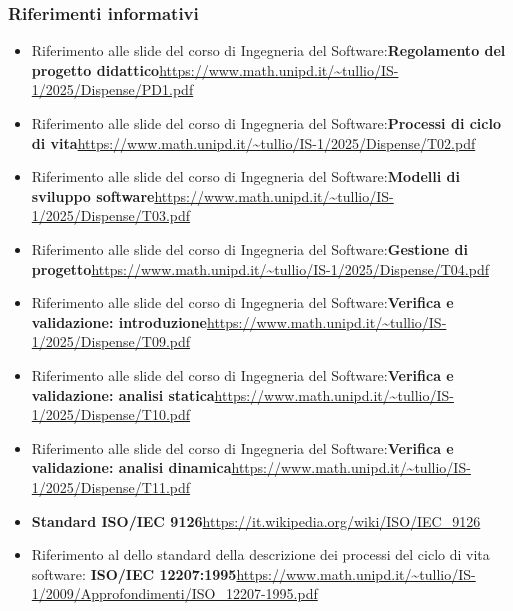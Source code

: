 \documentclass[a4paper,12pt]{article}
\begin{document}
{{        \subsubsection{Riferimenti informativi}{
            \begin{itemize}
                \item Riferimento alle slide del corso di Ingegneria del Software:\newline \textbf{Regolamento del progetto didattico}\newline \url{https://www.math.unipd.it/~tullio/IS-1/2025/Dispense/PD1.pdf}
                \item Riferimento alle slide del corso di Ingegneria del Software:\newline \textbf{Processi di ciclo di vita}\newline \url{https://www.math.unipd.it/~tullio/IS-1/2025/Dispense/T02.pdf}
                \item Riferimento alle slide del corso di Ingegneria del Software:\newline \textbf{Modelli di sviluppo software}\newline \url{https://www.math.unipd.it/~tullio/IS-1/2025/Dispense/T03.pdf}
                \item Riferimento alle slide del corso di Ingegneria del Software:\newline \textbf{Gestione di progetto}\newline \url{https://www.math.unipd.it/~tullio/IS-1/2025/Dispense/T04.pdf}
                \item Riferimento alle slide del corso di Ingegneria del Software:\newline \textbf{Verifica e validazione: introduzione}\newline \url{https://www.math.unipd.it/~tullio/IS-1/2025/Dispense/T09.pdf}
                \item Riferimento alle slide del corso di Ingegneria del Software:\newline \textbf{Verifica e validazione: analisi statica}\newline \url{https://www.math.unipd.it/~tullio/IS-1/2025/Dispense/T10.pdf}
                \item Riferimento alle slide del corso di Ingegneria del Software:\newline \textbf{Verifica e validazione: analisi dinamica}\newline \url{https://www.math.unipd.it/~tullio/IS-1/2025/Dispense/T11.pdf}
                 \item \textbf{Standard ISO/IEC 9126}\newline \url{https://it.wikipedia.org/wiki/ISO/IEC_9126}
                \item Riferimento al dello standard della descrizione dei processi del ciclo di vita software: \newline \textbf{ISO/IEC 12207:1995}\newline \url{https://www.math.unipd.it/~tullio/IS-1/2009/Approfondimenti/ISO_12207-1995.pdf}
            \end{itemize}
        }
    }
}
\end{document}
